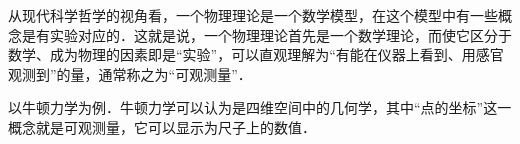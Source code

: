 
从现代科学哲学的视角看，一个物理理论是一个数学模型，在这个模型中有一些概念是有实验对应的．这就是说，一个物理理论首先是一个数学理论，而使它区分于数学、成为物理的因素即是“实验”，可以直观理解为“有能在仪器上看到、用感官观测到”的量，通常称之为“可观测量”．

以牛顿力学为例．牛顿力学可以认为是四维空间中的几何学，其中“点的坐标”这一概念就是可观测量，它可以显示为尺子上的数值．
































